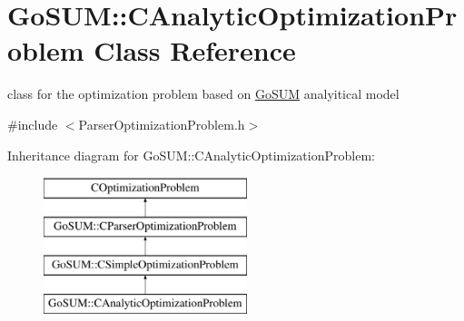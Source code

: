 \hypertarget{class_go_s_u_m_1_1_c_analytic_optimization_problem}{\section{Go\-S\-U\-M\-:\-:C\-Analytic\-Optimization\-Problem Class Reference}
\label{class_go_s_u_m_1_1_c_analytic_optimization_problem}
}


class for the optimization problem based on \hyperlink{namespace_go_s_u_m}{Go\-S\-U\-M} analyitical model  




{\ttfamily \#include $<$Parser\-Optimization\-Problem.\-h$>$}

Inheritance diagram for Go\-S\-U\-M\-:\-:C\-Analytic\-Optimization\-Problem\-:\begin{figure}[H]
\begin{center}
\leavevmode
\includegraphics[height=4.000000cm]{class_go_s_u_m_1_1_c_analytic_optimization_problem}
\end{center}
\end{figure}
